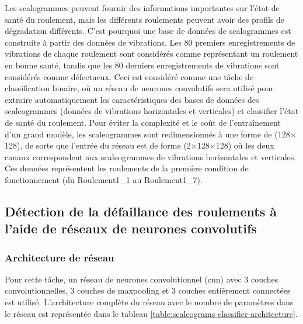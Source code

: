 Les scalogrammes peuvent fournir des informations importantes sur l'état de santé du roulement, mais les différents roulements peuvent avoir des profils de dégradation différents. C'est pourquoi une base de données de scalogrammes est construite à partir des données de vibrations. Les 80 premiers enregistrements de vibrations de chaque roulement sont considérés comme représentant un roulement en bonne santé, tandis que les 80 derniers enregistrements de vibrations sont considérés comme défectueux. Ceci est considéré comme une tâche de classification binaire, où un réseau de neurones convolutifs sera utilisé pour extraire automatiquement les caractéristiques des bases de données des scaleogrammes (données de vibrations horizontales et verticales) et classifier l'état de santé du roulement. Pour éviter la complexité et le coût de l'entraînement d'un grand modèle, les scaleogrammes sont redimensionnés à une forme de (128$\times$128), de sorte que l'entrée du réseau est de forme (2$\times$128$\times$128) où les deux canaux correspondent aux scaleogrammes de vibrations horizontales et verticales. Ces données représentent les roulements de la première condition de fonctionnement (du Roulement1\_1 au Roulement1\_7).

\subsection{Détection de la défaillance des roulements à l'aide de réseaux de neurones convolutifs}%
\label{sub:detecting_bearings_failure_using_convolutional_neural_networks}

\subsubsection{Architecture de réseau}%
\label{subsub:network_architecture}
Pour cette tâche, un réseau de neurones convolutionnel (\acrshort{cnn}) avec 3 couches convolutionnelles, 3 couches de maxpooling et 3 couches entièrement connectées est utilisé. L'architecture complète du réseau avec le nombre de paramètres dans le réseau est représentée dans le tableau \ref{table:scaleograms-classifier-architecture}.

